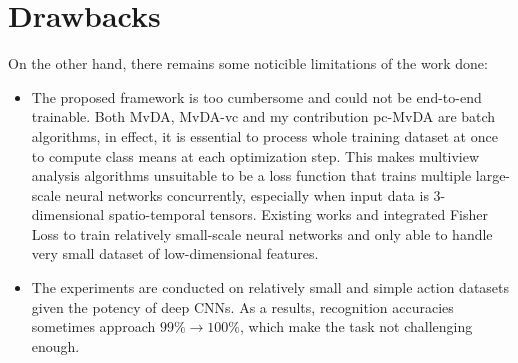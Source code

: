 
\section{Drawbacks} \label{sec:drawbacks}

    On the other hand, there remains some noticible limitations of the work done:
    \begin{itemize}
        \item The proposed framework is too cumbersome and could not be end-to-end trainable.
        Both MvDA, MvDA-vc and my contribution pc-MvDA are batch algorithms, in effect, it is essential to process whole training dataset at once to compute class means at each optimization step.
        This makes multiview analysis algorithms unsuitable to be a loss function that trains multiple large-scale neural networks concurrently, especially when input data is 3-dimensional spatio-temporal tensors.
        Existing works \cite{kan2016multi} and \cite{cao2017generalized} integrated Fisher Loss to train relatively small-scale neural networks and only able to handle very small dataset of low-dimensional features.
        \item The experiments are conducted on relatively small and simple action datasets given the potency of deep CNNs.
        As a results, recognition accuracies sometimes approach $99\%\to100\%$, which make the task not challenging enough.
    \end{itemize}
